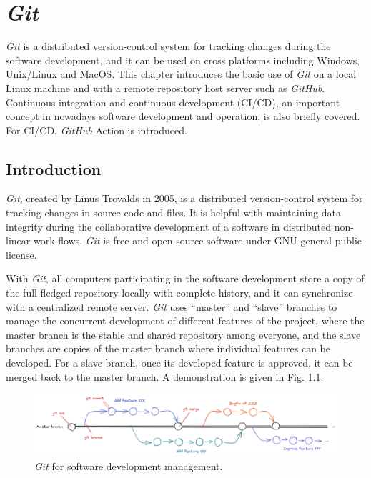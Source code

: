 \chapter{\textit{Git}}

\textit{Git} is a distributed version-control system for tracking changes during the software development, and it can be used on cross platforms including Windows, Unix/Linux and MacOS. This chapter introduces the basic use of \textit{Git} on a local Linux machine and with a remote repository host server such as \textit{GitHub}. Continuous integration and continuous development (CI/CD), an important concept in nowadays software development and operation, is also briefly covered. For CI/CD, \textit{GitHub} Action is introduced.

\section{Introduction}

\textit{Git}, created by Linus Trovalds in 2005, is a distributed version-control system for tracking changes in source code and files. It is helpful with maintaining data integrity during the collaborative development of a software in distributed non-linear work flows. \textit{Git} is free and open-source software under GNU general public license.

With \textit{Git}, all computers participating in the software development store a copy of the full-fledged repository locally with complete history, and it can synchronize with a centralized remote server. \textit{Git} uses ``master'' and ``slave'' branches to manage the concurrent development of different features of the project, where the master branch is the stable and shared repository among everyone, and the slave branches are copies of the master branch where individual features can be developed. For a slave branch, once its developed feature is approved, it can be merged back to the master branch. A demonstration is given in Fig. \ref{ch:sma:fig:gitflow}.
\begin{figure}[htbp]
	\centering
	\includegraphics[width=350pt]{chapters/part-2/figures/gitflow.png}
	\caption{\textit{Git} for software development management.} \label{ch:sma:fig:gitflow}
\end{figure}

